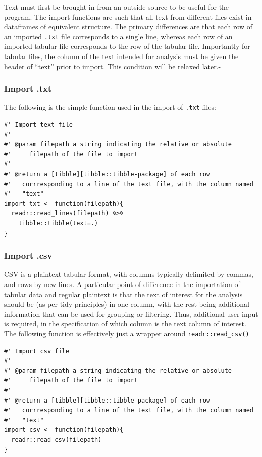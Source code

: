 \documentclass[11pt, a4paper, oneside]{report}
\begin{document}
Text must first be brought in from an outside source to be useful for
the program. The import functions are such that all text from
different files exist in dataframes of equivalent structure. The
primary differences are that each row of an imported \texttt{.txt}
file corresponds to a single line, whereas each row of an imported
tabular file corresponds to the row of the tabular file. Importantly
for tabular files, the column of the text intended for analysis must
be given the header of ``text'' prior to import. This condition will
be relaxed later.-

\subsubsection{Import .txt}
\label{sec:org0ff5f7d}
The following is the simple function used in the import of \texttt{.txt} files:
\begin{verbatim}
#' Import text file 
#'
#' @param filepath a string indicating the relative or absolute
#'     filepath of the file to import
#' 
#' @return a [tibble][tibble::tibble-package] of each row
#'   corrresponding to a line of the text file, with the column named
#'   "text"
import_txt <- function(filepath){
  readr::read_lines(filepath) %>%
    tibble::tibble(text=.)
}
\end{verbatim}
\subsubsection{Import .csv}
\label{sec:orgb2d558e}
CSV is a plaintext tabular format, with columns typically delimited by
commas, and rows by new lines. A particular point of difference in the
importation of tabular data and regular plaintext is that the text of
interest for the analysis should be (as per tidy principles) in one
column, with the rest being additional information that can be used
for grouping or filtering. Thus, additional user input is required, in
the specification of which column is the text column of interest. The
following function is effectively just a wrapper around
\texttt{readr::read_csv()}
\begin{verbatim}
#' Import csv file
#'
#' @param filepath a string indicating the relative or absolute
#'     filepath of the file to import
#'
#' @return a [tibble][tibble::tibble-package] of each row
#'   corrresponding to a line of the text file, with the column named
#'   "text"
import_csv <- function(filepath){
  readr::read_csv(filepath)
}
\end{verbatim}
\end{document}
